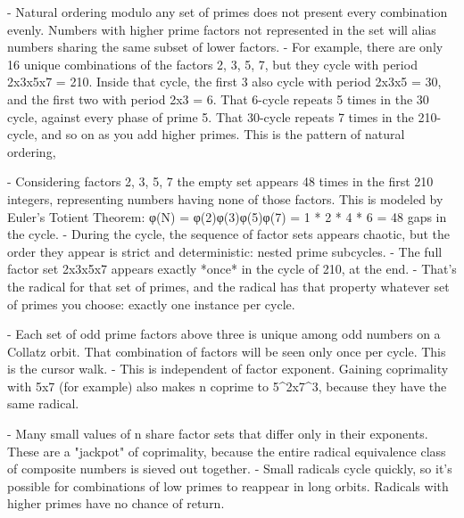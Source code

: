 \documentclass[12pt]{article}
\theoremstyle{plain}
\theoremstyle{definition}
\begin{document}
- Natural ordering modulo any set of primes does not present every combination evenly. Numbers with higher prime factors not represented in the set will alias numbers sharing the same subset of lower factors.
- For example, there are only 16 unique combinations of the factors {2, 3, 5, 7}, but they cycle with period 2x3x5x7 = 210. Inside that cycle, the first 3 also cycle with period 2x3x5 = 30, and the first two with period 2x3 = 6. That 6-cycle repeats 5 times in the 30 cycle, against every phase of prime 5. That 30-cycle repeats 7 times in the 210-cycle, and so on as you add higher primes. This is the pattern of natural ordering, 

- Considering factors {2, 3, 5, 7} the empty set {} appears 48 times in the first 210 integers, representing numbers having none of those factors. This is modeled by Euler's Totient Theorem: φ(N) = φ(2)φ(3)φ(5)φ(7) = 1 * 2 * 4 * 6 = 48 gaps in the cycle.
- During the cycle, the sequence of factor sets appears chaotic, but the order they appear is strict and deterministic: nested prime subcycles.
- The full factor set 2x3x5x7 appears exactly *once* in the cycle of 210, at the end.
- That's the radical for that set of primes, and the radical has that property whatever set of primes you choose: exactly one instance per cycle.

- Each set of odd prime factors above three is unique among odd numbers on a Collatz orbit. That combination of factors will be seen only once per cycle. This is the cursor walk.
- This is independent of factor exponent. Gaining coprimality with 5x7 (for example) also makes n coprime to 5^2x7^3, because they have the same radical.

- Many small values of n share factor sets that differ only in their exponents. These are a "jackpot" of coprimality, because the entire radical equivalence class of composite numbers is sieved out together.
- Small radicals cycle quickly, so it's possible for combinations of low primes to reappear in long orbits. Radicals with higher primes have no chance of return.
\end{document}
